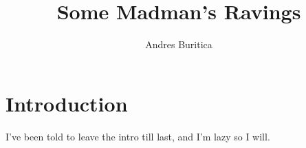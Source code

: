 \documentclass{book}
\title{Some Madman's Ravings}
\author{Andres Buritica}
\begin{document}
\maketitle
\section*{Introduction}
  I've been told to leave the intro till last, and I'm lazy so I will.
\end{document}
